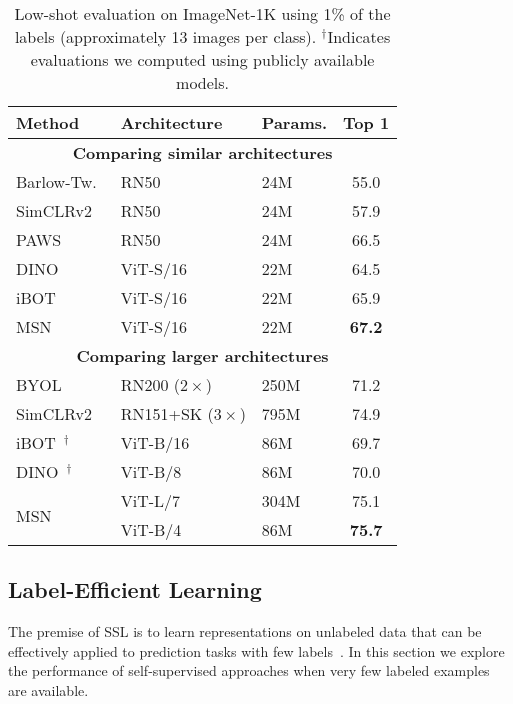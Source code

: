 \documentclass{article}
\begin{document}
\begin{table}[t]
    \caption{Low-shot evaluation on ImageNet-1K using 1\% of the labels (approximately 13 images per class). $^\dagger$Indicates evaluations we computed  using publicly available models.}
    \label{tb:lowshot_imagenet}
    \centering
    \begin{tabular}{l l l c}
        \bf Method & \bf Architecture & \bf Params. & \bf Top 1 \\\toprule
        \multicolumn{4}{c}{\scriptsize\bf Comparing similar architectures}\\[1mm]
        Barlow-Tw.~\citep{zbontar2021barlow} & RN50 & 24M & 55.0 \\
        SimCLRv2~\citep{chen2020big} & RN50 & 24M & 57.9 \\
        PAWS~\citep{assran2021semi} & RN50 & 24M & 66.5 \\[1mm]
        DINO~\citep{caron2021emerging} & ViT-S/16 & 22M & 64.5 \\
        iBOT~\citep{zhou2021ibot} & ViT-S/16 & 22M & 65.9 \\\midrule
        MSN & ViT-S/16 & 22M & \cellcolor{fbApp}\bf 67.2 \\
        \midrule \midrule
        \multicolumn{4}{c}{\scriptsize\bf Comparing larger architectures}\\[1mm]
        BYOL~\citep{grill2020bootstrap} &  RN200 ($2\times$) & 250M & 71.2 \\
        SimCLRv2~\citep{chen2020big} & RN151+SK ($3\times$) & 795M & 74.9 \\[1mm]
iBOT~\citep{zhou2021ibot}$^\dagger$ & ViT-B/16 & 86M & 69.7 \\
        DINO~\citep{caron2021emerging}$^\dagger$ & ViT-B/8 & 86M & 70.0 \\\midrule
        \multirow{2}{*}{MSN} & ViT-L/7 & 304M & 75.1 \\
        & ViT-B/4 & 86M & \cellcolor{fbApp}\bf 75.7 \\
        \bottomrule
    \end{tabular}
\end{table}

\subsection{Label-Efficient Learning}
The premise of SSL is to learn representations on unlabeled data that can be effectively applied to prediction tasks with few labels~\citep{chen2020big}. In this section we explore the performance of self-supervised approaches when very few labeled examples are available.
\end{document}

